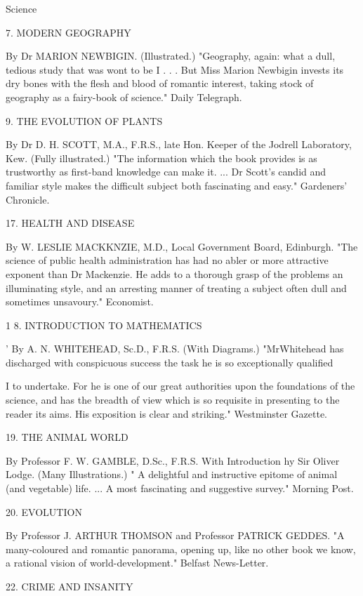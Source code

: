 \documentclass[12pt,leqno]{book}[2005/09/16]
\begin{document}
Science



7. MODERN GEOGRAPHY

By Dr MARION NEWBIGIN. (Illustrated.) "Geography, again: what a dull,
tedious study that was wont to be I . . . But Miss Marion Newbigin invests its
dry bones with the flesh and blood of romantic interest, taking stock of
geography as a fairy-book of science." Daily Telegraph.

9. THE EVOLUTION OF PLANTS

By Dr D. H. SCOTT, M.A., F.R.S., late Hon. Keeper of the Jodrell Laboratory,
Kew. (Fully illustrated.) "The information which the book provides is as
trustworthy as first-band knowledge can make it. ... Dr Scott's candid and
familiar style makes the difficult subject both fascinating and easy."
Gardeners' Chronicle.

17. HEALTH AND DISEASE

By W. LESLIE MACKKNZIE, M.D., Local Government Board, Edinburgh.
"The science of public health administration has had no abler or more attractive
exponent than Dr Mackenzie. He adds to a thorough grasp of the problems
an illuminating style, and an arresting manner of treating a subject often
dull and sometimes unsavoury." Economist.



1 8. INTRODUCTION TO MATHEMATICS

' By A. N. WHITEHEAD, Sc.D., F.R.S. (With Diagrams.) "MrWhitehead
has discharged with conspicuous success the task he is so exceptionally qualified

I to undertake. For he is one of our great authorities upon the foundations of the
science, and has the breadth of view which is so requisite in presenting to the
reader its aims. His exposition is clear and striking." Westminster Gazette.

19. THE ANIMAL WORLD

By Professor F. W. GAMBLE, D.Sc., F.R.S. With Introduction hy Sir Oliver
Lodge. (Many Illustrations.) " A delightful and instructive epitome of animal
(and vegetable) life. ... A most fascinating and suggestive survey." Morning
Post.

20. EVOLUTION

By Professor J. ARTHUR THOMSON and Professor PATRICK GEDDES. "A
many-coloured and romantic panorama, opening up, like no other book we know,
a rational vision of world-development." Belfast News-Letter.

22. CRIME AND INSANITY
\end{document}
